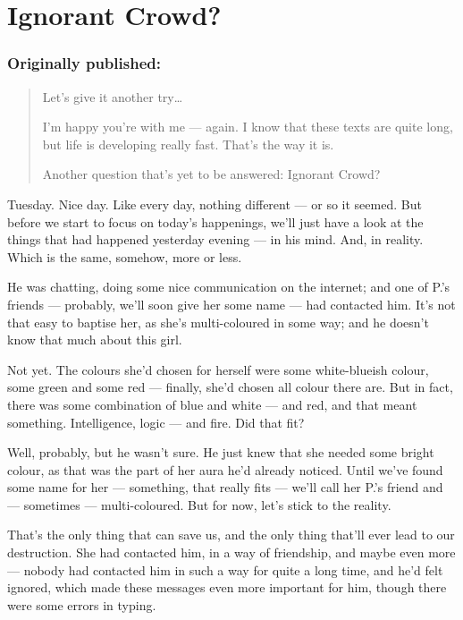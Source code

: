 \chapter{Ignorant Crowd?}
\label{cha:ignorant-crowd}
\subsection*{Originally published: }
\begin{quote}
Let's give it another try\ldots

I'm happy you're with me --- again. I know that these texts are quite long, but life is developing really fast. 
That's the way it is.

Another question that's yet to be answered: Ignorant Crowd?
\end{quote}

Tuesday. 
Nice day. 
Like every day, nothing different --- or so it seemed. 
But before we start to focus on today's happenings, we'll just have a look at the things that had happened yesterday evening --- in his mind. 
And, in reality. 
Which is the same, somehow, more or less.

He was chatting, doing some nice communication on the internet; and one of P.'s friends --- probably, we'll soon give her some name --- had contacted him. 
It's not that easy to baptise her, as she's multi-coloured in some way; and he doesn't know that much about this girl.

Not yet. 
The colours she'd chosen for herself were some white-blueish colour, some green and some red --- finally, she'd chosen all colour there are. 
But in fact, there was some combination of blue and white --- and red, and that meant something. 
Intelligence, logic --- and fire. 
Did that fit?

Well, probably, but he wasn't sure. 
He just knew that she needed some bright colour, as that was the part of her aura he'd already noticed. 
Until we've found some name for her --- something, that really fits --- we'll call her P.'s friend and --- sometimes --- multi-coloured. 
But for now, let's stick to the reality.

That's the only thing that can save us, and the only thing that'll ever lead to our destruction. 
She had contacted him, in a way of friendship, and maybe even more --- nobody had contacted him in such a way for quite a long time, and he'd felt ignored, which made these messages even more important for him, though there were some errors in typing.

